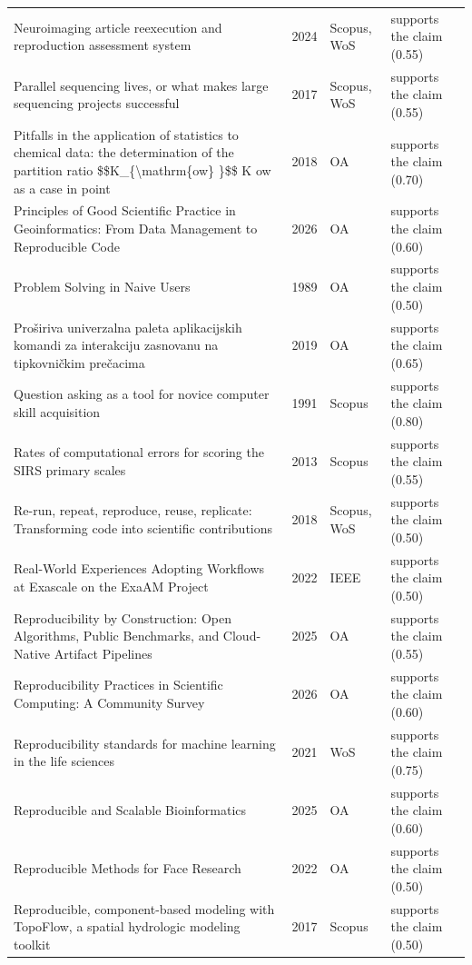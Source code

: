 \begin{longtable}{@{}%
  >{\raggedright\arraybackslash}p{}c%
  >{\raggedright\arraybackslash}p{}%
  >{\raggedright\arraybackslash}p{}@{}}
Neuroimaging article reexecution and reproduction assessment system & 2024 & Scopus, WoS & supports the claim (0.55) \\
Parallel sequencing lives, or what makes large sequencing projects successful & 2017 & Scopus, WoS & supports the claim (0.55) \\
Pitfalls in the application of statistics to chemical data: the determination of the partition ratio \$\$K\_\{\textbackslash{}mathrm\{ow\} \}\$\$ K ow as a case in point & 2018 & OA & supports the claim (0.70) \\
Principles of Good Scientific Practice in Geoinformatics: From Data Management to Reproducible Code & 2026 & OA & supports the claim (0.60) \\
Problem Solving in Naive Users & 1989 & OA & supports the claim (0.50) \\
Proširiva univerzalna paleta aplikacijskih komandi za interakciju zasnovanu na tipkovničkim prečacima & 2019 & OA & supports the claim (0.65) \\
Question asking as a tool for novice computer skill acquisition & 1991 & Scopus & supports the claim (0.80) \\
Rates of computational errors for scoring the SIRS primary scales & 2013 & Scopus & supports the claim (0.55) \\
Re-run, repeat, reproduce, reuse, replicate: Transforming code into scientific contributions & 2018 & Scopus, WoS & supports the claim (0.50) \\
Real-World Experiences Adopting Workflows at Exascale on the ExaAM Project & 2022 & IEEE & supports the claim (0.50) \\
Reproducibility by Construction: Open Algorithms, Public Benchmarks, and Cloud-Native Artifact Pipelines & 2025 & OA & supports the claim (0.55) \\
Reproducibility Practices in Scientific Computing: A Community Survey & 2026 & OA & supports the claim (0.60) \\
Reproducibility standards for machine learning in the life sciences & 2021 & WoS & supports the claim (0.75) \\
Reproducible and Scalable Bioinformatics & 2025 & OA & supports the claim (0.60) \\
Reproducible Methods for Face Research & 2022 & OA & supports the claim (0.50) \\
Reproducible, component-based modeling with TopoFlow, a spatial hydrologic modeling toolkit & 2017 & Scopus & supports the claim (0.50) \\

\end{longtable}

